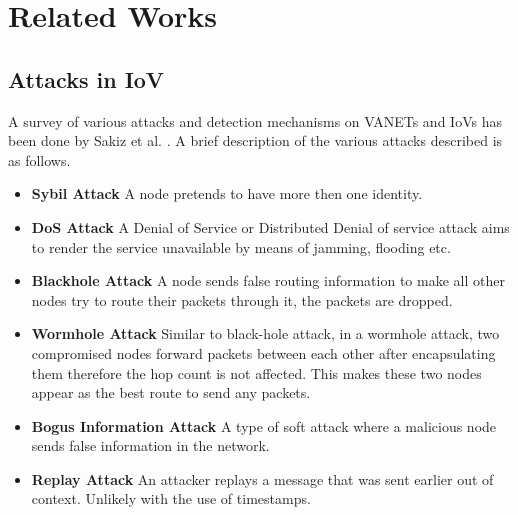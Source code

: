 \documentclass[journal]{IEEEtran}
\begin{document}

\section{Related Works}
\label{sec:RV}
\subsection{Attacks in IoV}
\label{sec:RV:attacks}
A survey of various attacks and detection mechanisms on VANETs and IoVs has been done by Sakiz et al. \cite{c:AttacksSurvey}. A brief description of the various attacks described is as follows.
\begin{itemize}
	\item \textbf{Sybil Attack} A node pretends to have more then one identity.
	\item \textbf{DoS Attack} A Denial of Service or Distributed Denial of service attack aims to render the service unavailable by means of jamming, flooding etc.
	\item \textbf{Blackhole Attack} A node sends false routing information to make all other nodes try to route their packets through it, the packets are dropped.
	\item \textbf{Wormhole Attack} Similar to black-hole attack, in a wormhole attack, two compromised nodes forward packets between each other after encapsulating them therefore the hop count is not affected. This makes these two nodes appear as the best route to send any packets.
	\item \textbf{Bogus Information Attack} A type of soft attack where a malicious node sends false information in the network.
	\item \textbf{Replay Attack} An attacker replays a message that was sent earlier out of context. Unlikely with the use of timestamps.
\end{itemize}
\end{document}
